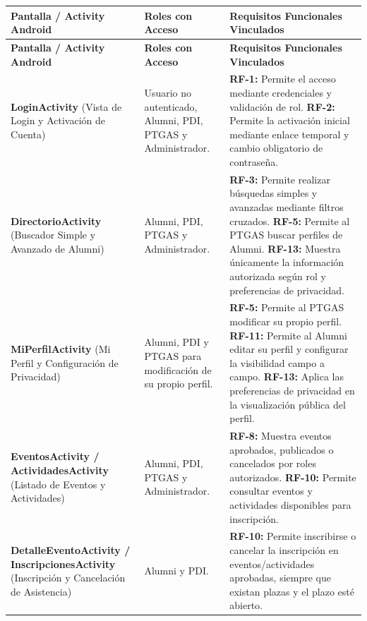 \documentclass{report}
\begin{document}
\begin{center}
\small
\renewcommand{\arraystretch}{1.25}
\begin{longtable}{|p{}|p{}|p{}|}
\hline
\textbf{Pantalla / Activity Android} &
\textbf{Roles con Acceso} &
\textbf{Requisitos Funcionales Vinculados} \\
\hline
\endfirsthead
\hline
\textbf{Pantalla / Activity Android} &
\textbf{Roles con Acceso} &
\textbf{Requisitos Funcionales Vinculados} \\
\hline
\endhead
\textbf{LoginActivity} (Vista de Login y Activación de Cuenta) &
Usuario no autenticado, Alumni, PDI, PTGAS y Administrador. &
\textbf{RF-1:} Permite el acceso mediante credenciales y validación de rol.
\newline
\textbf{RF-2:} Permite la activación inicial mediante enlace temporal y cambio obligatorio de contraseña. \\
\hline
\textbf{DirectorioActivity} (Buscador Simple y Avanzado de Alumni) &
Alumni, PDI, PTGAS y Administrador. &
\textbf{RF-3:} Permite realizar búsquedas simples y avanzadas mediante filtros cruzados.
\newline
\textbf{RF-5:} Permite al PTGAS buscar perfiles de Alumni.
\newline
\textbf{RF-13:} Muestra únicamente la información autorizada según rol y preferencias de privacidad. \\
\hline
\textbf{MiPerfilActivity} (Mi Perfil y Configuración de Privacidad) &
Alumni, PDI y PTGAS para modificación de su propio perfil. &
\textbf{RF-5:} Permite al PTGAS modificar su propio perfil.
\newline
\textbf{RF-11:} Permite al Alumni editar su perfil y configurar la visibilidad campo a campo.
\newline
\textbf{RF-13:} Aplica las preferencias de privacidad en la visualización pública del perfil. \\
\hline
\textbf{EventosActivity / ActividadesActivity} (Listado de Eventos y Actividades) &
Alumni, PDI, PTGAS y Administrador. &
\textbf{RF-8:} Muestra eventos aprobados, publicados o cancelados por roles autorizados.
\newline
\textbf{RF-10:} Permite consultar eventos y actividades disponibles para inscripción. \\
\hline
\textbf{DetalleEventoActivity / InscripcionesActivity} (Inscripción y Cancelación de Asistencia) &
Alumni y PDI. &
\textbf{RF-10:} Permite inscribirse o cancelar la inscripción en eventos/actividades aprobadas, siempre que existan plazas y el plazo esté abierto. \\

\end{longtable}
\end{center}
\end{document}
